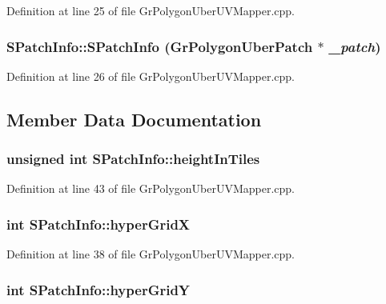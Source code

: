 Definition at line 25 of file GrPolygonUberUVMapper.cpp.\hypertarget{struct_s_patch_info_4b4682e6d73154569bc8ca299ab855cf}{
\subsubsection[{SPatchInfo}]{\setlength{\rightskip}{0pt plus 5cm}SPatchInfo::SPatchInfo ({\bf GrPolygonUberPatch} $\ast$ {\em \_\-patch})}}
\label{struct_s_patch_info_4b4682e6d73154569bc8ca299ab855cf}




Definition at line 26 of file GrPolygonUberUVMapper.cpp.

\subsection{Member Data Documentation}
\hypertarget{struct_s_patch_info_2950f8cae1b56d69c51feeaa4522887e}{
\subsubsection[{heightInTiles}]{\setlength{\rightskip}{0pt plus 5cm}unsigned int {\bf SPatchInfo::heightInTiles}}}
\label{struct_s_patch_info_2950f8cae1b56d69c51feeaa4522887e}




Definition at line 43 of file GrPolygonUberUVMapper.cpp.\hypertarget{struct_s_patch_info_d0421f5b9103e13978690243214d8c49}{
\subsubsection[{hyperGridX}]{\setlength{\rightskip}{0pt plus 5cm}int {\bf SPatchInfo::hyperGridX}}}
\label{struct_s_patch_info_d0421f5b9103e13978690243214d8c49}




Definition at line 38 of file GrPolygonUberUVMapper.cpp.\hypertarget{struct_s_patch_info_f63b67693d9f04b7bc8ba5ff3417b78e}{
\subsubsection[{hyperGridY}]{\setlength{\rightskip}{0pt plus 5cm}int {\bf SPatchInfo::hyperGridY}}}
\label{struct_s_patch_info_f63b67693d9f04b7bc8ba5ff3417b78e}




